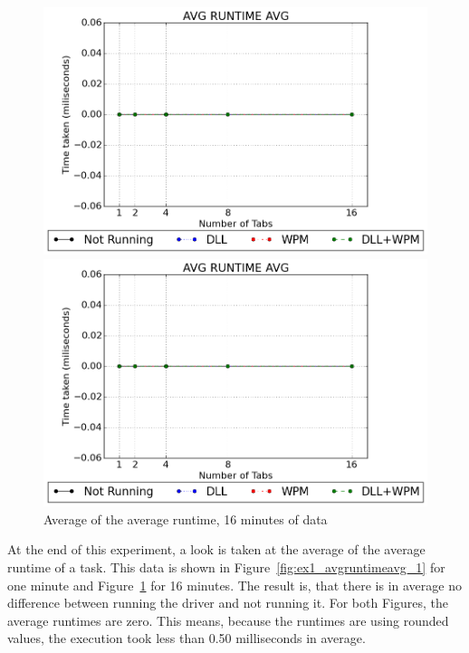 \begin{figure}[h]
	\centering
    \includegraphics[width=\textwidth,height=0.45\textheight,keepaspectratio]{Evaluation/experiment1/AVG-RUNTIME-AVG-1.png}
    \caption{Average of the average runtime, 1 minute of data}
    \label{fig:ex1_avgruntimeavg_1}
    
  	\vspace*{\floatsep}    
    
    \includegraphics[width=\textwidth,height=0.45\textheight,keepaspectratio]{Evaluation/experiment1/AVG-RUNTIME-AVG-16.png}
    \caption{Average of the average runtime, 16 minutes of data}
    \label{fig:ex1_avgruntimeavg_16}
\end{figure}
At the end of this experiment, a look is taken at the average of the average runtime of a task. This data is shown in Figure~\ref{fig:ex1_avgruntimeavg_1} for one minute and Figure~\ref{fig:ex1_avgruntimeavg_16} for 16 minutes. The result is, that there is in average no difference between running the driver and not running it. For both Figures, the average runtimes are zero. This means, because the runtimes are using rounded values, the execution took less than 0.50 milliseconds in average.

